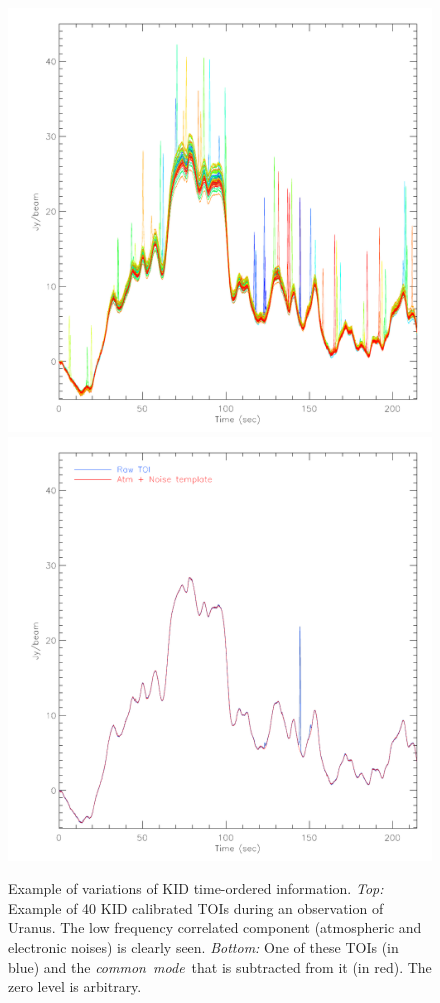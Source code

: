\documentclass[traditionalabstract]{aa}
\newcommand{\cm}{\emph{common~mode}}
\newcommand{\lp}[1]{#1}
\begin{document}
\begin{figure}[ht!]
\begin{center}
\includegraphics[clip, angle=0, scale=0.4]{Figures/toi_plot-eps-converted-to.pdf}
\includegraphics[clip, angle=0, scale=0.4]{Figures/toi_plot_decorr-eps-converted-to.pdf}
\caption[Example of Time-Ordered-Information]{Example of variations of KID
  time-ordered information. \emph{Top:} Example of 40 KID {\lp calibrated} TOIs during an observation
  of Uranus. The low frequency correlated component (atmospheric and electronic
  noises) is clearly seen. \emph{Bottom:} One of these TOIs (in blue) and the
  \cm\ that is subtracted from it (in red). {\lp The zero level is arbitrary.}}
\label{fig:nika_toi}
\end{center}
\end{figure}
\end{document}
